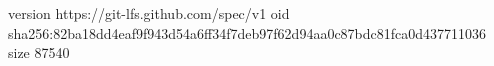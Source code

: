 version https://git-lfs.github.com/spec/v1
oid sha256:82ba18dd4eaf9f943d54a6ff34f7deb97f62d94aa0c87bdc81fca0d437711036
size 87540
